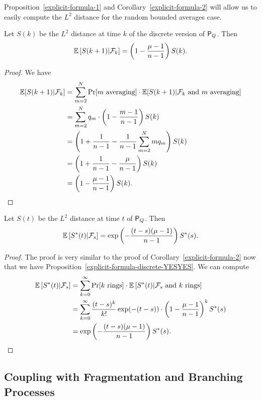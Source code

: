 \documentclass[12pt]{article}
\begin{document}
Proposition~\ref{explicit-formula-1} and Corollary~\ref{explicit-formula-2} will allow us to easily compute the $L^2$ distance for the random bounded averages case. 

\begin{prop} \label{explicit-formula-discrete-YESYES}
	Let $S(k)$ be the $L^2$ distance at time $k$ of the discrete version of $\mathsf{P}_Q$. Then 
	\[
		\mathbb{E} \left [ S(k+1) | \mathcal{F}_k \right ] = \left ( 1 - \frac{\mu - 1}{n-1} \right ) S(k). 
	\]
\end{prop}
\begin{proof}
	We have 
	\begin{align*}
		\mathbb{E}[S(k+1) | \mathcal{F}_k] & = \sum_{m = 2}^N \Pr[m \text{ averaging}] \cdot \mathbb{E}[S(k+1) | \mathcal{F}_k \text{ and } m \text{ averaging}] \\
		& = \sum_{m = 2}^N q_m \cdot \left ( 1 - \frac{m -1}{n-1} \right ) S(k) \\
		& = \left ( 1 + \frac{1}{n-1} - \frac{1}{n-1} \sum_{m = 2}^N mq_m \right ) S(k) \\
		& = \left ( 1 + \frac{1}{n-1} - \frac{\mu}{n-1} \right ) S(k) \\
		& = \left ( 1 - \frac{\mu - 1}{n-1} \right ) S(k). 
	\end{align*}
\end{proof}

\begin{cor} \label{explicit-formula-continuous-YESYES}
	Let $S(t)$ be the $L^2$ distance at time $t$ of $\mathsf{P}_Q$. Then 
	\[
		\mathbb{E} \left [ S^*(t) | \mathcal{F}_s \right ] = \exp \left ( - \frac{(t-s)(\mu - 1)}{n-1} \right ) S^*(s).
	\]
\end{cor}

\begin{proof}
	The proof is very similar to the proof of Corollary~\ref{explicit-formula-2} now that we have Proposition~\ref{explicit-formula-discrete-YESYES}. We can compute 
	\begin{align*}
		\mathbb{E} \left [S^*(t) | \mathcal{F}_s \right ] & = \sum_{k = 0}^\infty \Pr[k \text{ rings}] \cdot \mathbb{E} \left [ S^*(t) | \mathcal{F}_s \text{ and } k \text{ rings} \right ] \\
		& = \sum_{k = 0}^\infty \frac{(t-s)^k}{k!} \exp (-(t-s)) \cdot \left ( 1 - \frac{\mu - 1}{n-1} \right )^k S^*(s) \\
		& = \exp \left ( - \frac{(t-s) (\mu - 1)}{n-1} \right ) S^*(s). 
	\end{align*}
\end{proof}

\subsection{Coupling with Fragmentation and Branching Processes}
\end{document}
